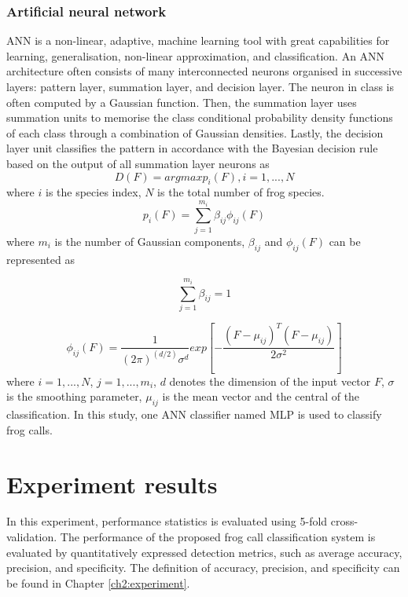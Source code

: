 \subsubsection{Artificial neural network}
ANN is a non-linear, adaptive, machine learning tool with great capabilities for learning, generalisation, non-linear approximation, and classification. An ANN architecture often consists of many interconnected neurons organised in successive layers: pattern layer, summation layer, and decision layer. The neuron in class is often computed by a Gaussian function. Then, the summation layer uses summation units to memorise the class conditional probability density functions of each class through a combination of Gaussian densities. Lastly, the decision layer unit classifies the pattern in accordance with the Bayesian decision rule based on the output of all summation layer neurons as 
\begin{equation}
D(F)=argmax{p_{i}(F)}, i =1,...,N
\end{equation}
where $i$ is the species index, $N$ is the total number of frog species.
\begin{equation}
p_{i}(F)=\sum_{j=1}^{m_{i}}\beta_{ij}\phi_{ij}(F)
\end{equation}
where $m_{i}$ is the number of Gaussian components, $\beta_{ij}$ and $\phi_{ij}(F)$ can be represented as

\begin{equation}
\sum_{j=1}^{m_{i}}\beta_{ij}=1
\end{equation}

\begin{equation}
\phi_{ij}(F)=\frac{1}{(2\pi)^(d/2)\sigma^{d}}exp[-\frac{(F-\mu_{ij})^{T}(F-\mu_{ij})}{2\sigma^2}]
\end{equation}
where $i=1,...,N$, $j=1,...,m_{i}$, $d$ denotes the dimension of the input vector $F$, $\sigma$ is the smoothing parameter, $\mu_{ij}$ is the mean vector and the central of the classification. In this study, one ANN classifier named MLP is used to classify frog calls.

\section{Experiment results}
In this experiment, performance statistics is evaluated using 5-fold cross-validation. The performance of the proposed frog call classification system is evaluated by quantitatively expressed detection metrics, such as average accuracy, precision, and specificity. The definition of accuracy, precision, and specificity can be found in Chapter \ref{ch2:experiment}.

